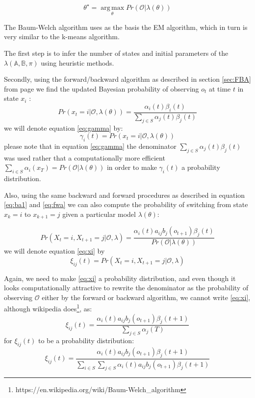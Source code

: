\documentclass[a4paper,12pt]{article}
\theoremstyle{definition}
\begin{document}
$$\theta^{\star} = \underset{\theta}{\operatorname{arg\, max}}Pr\left(\mathcal{O} | \lambda(\theta)\right)$$

The Baum-Welch algorithm uses as the basis the EM algorithm, which in turn is very similar to the k-means algorithm.  

The first step is to infer the number of states and initial parameters of the  $\lambda(\mathbb{A,B},\pi)$ using heuristic methods. 

Secondly, using the forward/backward algorithm as described in section \ref{sec:FBA} from page \pageref{sec:FBA} we find the updated Bayesian probability of observing $o_t$ at time $t$ in state $x_i$ :
\begin{equation}\label{eq:gamma}
Pr\left(x_t=i|\mathcal{O},\lambda(\theta)\right) =  \frac{\alpha_i(t) \beta_i(t)}{\sum_{j \in S}\alpha_j(t) \beta_j(t) }
\end{equation}
we will denote equation \ref{eq:gamma} by:
\begin{equation}
\gamma_i(t) = Pr\left(x_t=i|\mathcal{O},\lambda(\theta)\right)
\end{equation}
please note that in equation \ref{eq:gamma} the denominator $\sum_{j \in S}\alpha_j(t) \beta_j(t) $ was used rather that a computationally more efficient $\sum_{i \in S} \alpha_i(x_T) = Pr(\mathcal{O}|\lambda(\theta))$ in order to make $\gamma_i(t)$ a probability distribution.


Also, using the same backward and forward procedures as described in equation \ref{eq:ba1} and \ref{eq:fwa} we can also compute the probability of switching from state $x_k=i$ to $x_{k+1}=j$ given a particular model $\lambda(\theta)$:

\begin{equation}\label{eq:xi}
Pr(X_t=i,X_{t+1}=j|\mathcal{O},\lambda) = 
\frac{\alpha_i(t) a_{ij} b_j(o_{t+1}) \beta_j(t)}{Pr(\mathcal{O}|\lambda(\theta))}
\end{equation}
we will denote equation \ref{eq:xi} by
\begin{equation}
\xi_{ij}(t) = Pr(X_t=i,X_{t+1}=j|\mathcal{O},\lambda)
\end{equation}

Again, we need to make \ref{eq:xi} a probability distribution, and even though it looks computationally attractive to rewrite the denominator as the probability of observing $\mathcal{O}$ either by the forward or backward algorithm, we cannot write  \ref{eq:xi}, although wikipedia does\footnote{https://en.wikipedia.org/wiki/Baum-Welch\_algorithm}, as:
\begin{equation}
\xi_{ij}(t) =  
\frac{\alpha_i(t) a_{ij} b_j(o_{t+1}) \beta_j(t+1)}{\sum_{j\in S} \alpha_j(T)}
\end{equation}
for $\xi_{ij}(t)$ to be a probability distribution:
\begin{equation}
\xi_{ij}(t) =  \frac{\alpha_i(t) a_{ij} b_j(o_{t+1}) \beta_j(t+1)}
					{\sum_{i\in S}\sum_{j\in S} \alpha_i(t) a_{ij} b_j(o_{t+1}) \beta_j(t+1) }
\end{equation}
\end{document}
